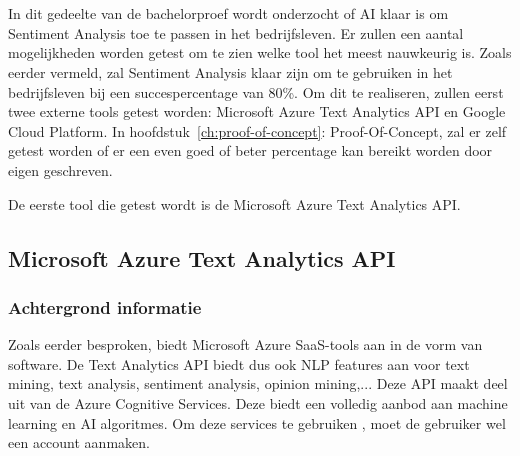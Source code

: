 
\chapter{}
\label{ch:methodologie}


In dit gedeelte van de bachelorproef wordt onderzocht of AI klaar is om Sentiment Analysis toe te passen in het bedrijfsleven. Er zullen een aantal mogelijkheden worden getest om te zien welke tool het meest nauwkeurig is. Zoals eerder vermeld, zal Sentiment Analysis klaar zijn om te gebruiken in het bedrijfsleven bij een succespercentage van 80\%. Om dit te realiseren, zullen eerst twee externe tools getest worden: Microsoft Azure Text Analytics API en Google Cloud Platform. In hoofdstuk~\ref{ch:proof-of-concept}: Proof-Of-Concept, zal er zelf getest worden of er een even goed of beter percentage kan bereikt worden door eigen geschreven.

De eerste tool die getest wordt is de Microsoft Azure Text Analytics API. 

\section{Microsoft Azure Text Analytics API}

\subsection{Achtergrond informatie}
\label{achtergrondinformatieazure}
Zoals eerder besproken, biedt Microsoft Azure SaaS-tools aan in de vorm van software. De Text Analytics API biedt dus ook NLP features aan voor text mining, text analysis, sentiment analysis, opinion mining,... \autocite{Microsoft2020} Deze API maakt deel uit van de Azure Cognitive Services. Deze biedt een volledig aanbod aan machine learning en AI algoritmes. Om deze services te gebruiken , moet de gebruiker wel een account aanmaken. \autocite{Microsoft2020}

